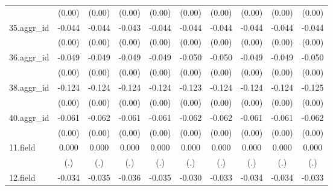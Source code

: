 {\begin{tabular}{l*{9}{c}}
          &   (0.00)         &   (0.00)         &   (0.00)         &   (0.00)         &   (0.00)         &   (0.00)         &   (0.00)         &   (0.00)         &   (0.00)         \\
[1em]
35.aggr\_id&   -0.044\sym{***}&   -0.044\sym{***}&   -0.043\sym{***}&   -0.044\sym{***}&   -0.044\sym{***}&   -0.044\sym{***}&   -0.044\sym{***}&   -0.044\sym{***}&   -0.044\sym{***}\\
          &   (0.00)         &   (0.00)         &   (0.00)         &   (0.00)         &   (0.00)         &   (0.00)         &   (0.00)         &   (0.00)         &   (0.00)         \\
[1em]
36.aggr\_id&   -0.049\sym{***}&   -0.049\sym{***}&   -0.049\sym{***}&   -0.049\sym{***}&   -0.050\sym{***}&   -0.050\sym{***}&   -0.049\sym{***}&   -0.049\sym{***}&   -0.050\sym{***}\\
          &   (0.00)         &   (0.00)         &   (0.00)         &   (0.00)         &   (0.00)         &   (0.00)         &   (0.00)         &   (0.00)         &   (0.00)         \\
[1em]
38.aggr\_id&   -0.124\sym{***}&   -0.124\sym{***}&   -0.124\sym{***}&   -0.124\sym{***}&   -0.123\sym{***}&   -0.124\sym{***}&   -0.124\sym{***}&   -0.124\sym{***}&   -0.125\sym{***}\\
          &   (0.00)         &   (0.00)         &   (0.00)         &   (0.00)         &   (0.00)         &   (0.00)         &   (0.00)         &   (0.00)         &   (0.00)         \\
[1em]
40.aggr\_id&   -0.061\sym{***}&   -0.062\sym{***}&   -0.061\sym{***}&   -0.061\sym{***}&   -0.062\sym{***}&   -0.062\sym{***}&   -0.061\sym{***}&   -0.061\sym{***}&   -0.062\sym{***}\\
          &   (0.00)         &   (0.00)         &   (0.00)         &   (0.00)         &   (0.00)         &   (0.00)         &   (0.00)         &   (0.00)         &   (0.00)         \\
[1em]
11.field  &    0.000         &    0.000         &    0.000         &    0.000         &    0.000         &    0.000         &    0.000         &    0.000         &    0.000         \\
          &      (.)         &      (.)         &      (.)         &      (.)         &      (.)         &      (.)         &      (.)         &      (.)         &      (.)         \\
[1em]
12.field  &   -0.034\sym{***}&   -0.035\sym{***}&   -0.036\sym{***}&   -0.035\sym{***}&   -0.030\sym{***}&   -0.033\sym{***}&   -0.034\sym{***}&   -0.034\sym{***}&   -0.033\sym{***}\\

\end{tabular}}
